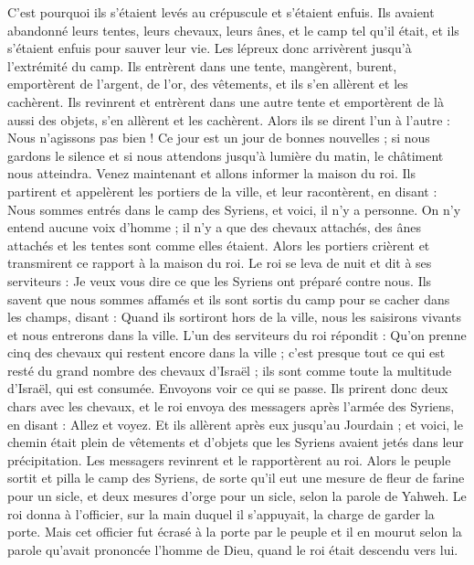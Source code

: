\begin{multicols}{2}
C'est pourquoi ils s'étaient levés au crépuscule et s'étaient enfuis. Ils avaient abandonné leurs tentes, leurs chevaux, leurs ânes, et le camp tel qu'il était, et ils s'étaient enfuis pour sauver leur vie.
Les lépreux donc arrivèrent jusqu'à l'extrémité du camp. Ils entrèrent dans une tente, mangèrent, burent, emportèrent de l'argent, de l'or, des vêtements, et ils s'en allèrent et les cachèrent. Ils revinrent et entrèrent dans une autre tente et emportèrent de là aussi des objets, s'en allèrent et les cachèrent.
Alors ils se dirent l'un à l'autre : Nous n'agissons pas bien ! Ce jour est un jour de bonnes nouvelles ; si nous gardons le silence et si nous attendons jusqu'à lumière du matin, le châtiment nous atteindra. Venez maintenant et allons informer la maison du roi.
Ils partirent et appelèrent les portiers de la ville, et leur racontèrent, en disant : Nous sommes entrés dans le camp des Syriens, et voici, il n'y a personne. On n'y entend aucune voix d'homme ; il n'y a que des chevaux attachés, des ânes attachés et les tentes sont comme elles étaient.
Alors les portiers crièrent et transmirent ce rapport à la maison du roi.
Le roi se leva de nuit et dit à ses serviteurs : Je veux vous dire ce que les Syriens ont préparé contre nous. Ils savent que nous sommes affamés et ils sont sortis du camp pour se cacher dans les champs, disant : Quand ils sortiront hors de la ville, nous les saisirons vivants et nous entrerons dans la ville.
L'un des serviteurs du roi répondit : Qu'on prenne cinq des chevaux qui restent encore dans la ville ; c'est presque tout ce qui est resté du grand nombre des chevaux d'Israël ; ils sont comme toute la multitude d'Israël, qui est consumée. Envoyons voir ce qui se passe.
Ils prirent donc deux chars avec les chevaux, et le roi envoya des messagers après l'armée des Syriens, en disant : Allez et voyez.
Et ils allèrent après eux jusqu'au Jourdain ; et voici, le chemin était plein de vêtements et d'objets que les Syriens avaient jetés dans leur précipitation. Les messagers revinrent et le rapportèrent au roi.
Alors le peuple sortit et pilla le camp des Syriens, de sorte qu'il eut une mesure de fleur de farine pour un sicle, et deux mesures d'orge pour un sicle, selon la parole de Yahweh.
Le roi donna à l'officier, sur la main duquel il s'appuyait, la charge de garder la porte. Mais cet officier fut écrasé à la porte par le peuple et il en mourut selon la parole qu'avait prononcée l'homme de Dieu, quand le roi était descendu vers lui.

\end{multicols}

